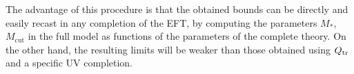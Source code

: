 The advantage of this procedure is that the obtained bounds can be directly and easily recast in any  completion of the EFT, by computing the parameters $M_*$, $M_\text{cut}$ in the full model as functions of the parameters of the complete theory. On the other hand, the resulting limits will be weaker than those obtained using $Q_{\rm tr}$ and a specific UV completion.



  

% 

